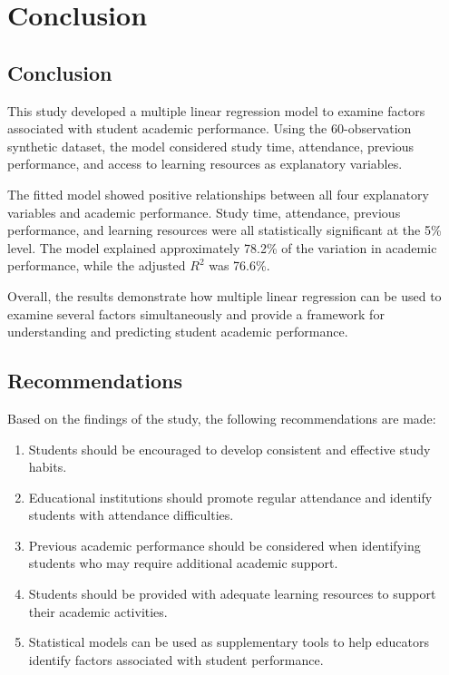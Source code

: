 \section{Conclusion}

\subsection{Conclusion}

This study developed a multiple linear regression model to examine factors associated with student academic performance. Using the 60-observation synthetic dataset, the model considered study time, attendance, previous performance, and access to learning resources as explanatory variables.

The fitted model showed positive relationships between all four explanatory variables and academic performance. Study time, attendance, previous performance, and learning resources were all statistically significant at the 5\% level. The model explained approximately 78.2\% of the variation in academic performance, while the adjusted $R^2$ was 76.6\%.

Overall, the results demonstrate how multiple linear regression can be used to examine several factors simultaneously and provide a framework for understanding and predicting student academic performance.

\subsection{Recommendations}

Based on the findings of the study, the following recommendations are made:

\begin{enumerate}
    \item Students should be encouraged to develop consistent and effective study habits.
    \item Educational institutions should promote regular attendance and identify students with attendance difficulties.
    \item Previous academic performance should be considered when identifying students who may require additional academic support.
    \item Students should be provided with adequate learning resources to support their academic activities.
    \item Statistical models can be used as supplementary tools to help educators identify factors associated with student performance.
\end{enumerate}

